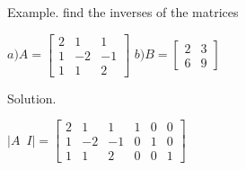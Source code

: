 \documentclass[11pt]{amsbook}
\begin{document}

Example. find the inverses of the matrices

$ a) A=\begin{bmatrix}
2 & 1 & 1 \\
1 & -2 & -1 \\
1 & 1 & 2
\end{bmatrix}$
$ b) B=\begin{bmatrix}
2 & 3 \\
6 & 9
\end{bmatrix}$

Solution.

$
\lvert A \enspace I \rvert = 
\left[\begin{array}{ccc|ccc}
2 & 1 & 1  & 1 & 0 & 0 \\
1 & -2 & -1 & 0 & 1 & 0 \\
1 & 1 & 2 & 0 & 0 & 1
\end{array}\right]
$
\newline
\end{document}
